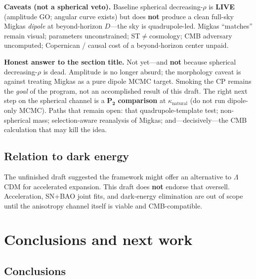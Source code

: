 \documentclass[11pt,a4paper]{article}
\begin{document}
\textbf{Caveats (not a spherical veto).} Baseline spherical decreasing-\(\rho\) is \textbf{LIVE} (amplitude GO; angular curve exists) but does \textbf{not} produce a clean full-sky Migkas \emph{dipole} at beyond-horizon \(D\)---the sky is quadrupole-led. Migkas ``matches'' remain visual; parameters unconstrained; ST\(\neq\)cosmology; CMB adversary uncomputed; Copernican / causal cost of a beyond-horizon center unpaid.

\textbf{Honest answer to the section title.} Not yet---and \textbf{not} because spherical decreasing-\(\rho\) is dead. Amplitude is no longer absurd; the morphology caveat is against treating Migkas as a pure dipole MCMC target. Smoking the CP remains the \emph{goal} of the program, not an accomplished result of this draft. The right next step on the spherical channel is a \(\boldsymbol{P_2}\) \textbf{comparison} at \(\kappa_{\mathrm{natural}}\) (do not run dipole-only MCMC). Paths that remain open: that quadrupole-template test; non-spherical mass; selection-aware reanalysis of Migkas; and---decisively---the CMB calculation that may kill the idea.

\subsection{Relation to dark energy}

The unfinished draft suggested the framework might offer an alternative to \(\Lambda\)CDM for accelerated expansion. This draft does \textbf{not} endorse that oversell. Acceleration, SN+BAO joint fits, and dark-energy elimination are out of scope until the anisotropy channel itself is viable and CMB-compatible.

\section{Conclusions and next work}

\subsection{Conclusions}
\end{document}
